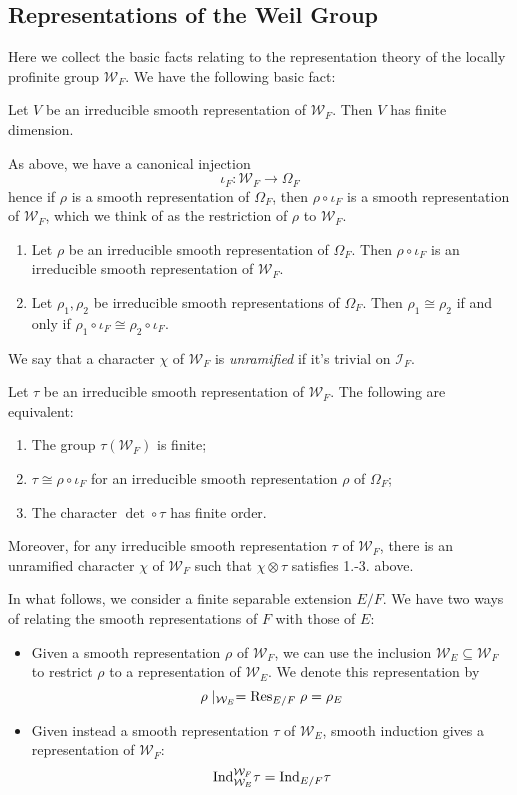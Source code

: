 \subsection{Representations of the Weil Group}
Here we collect the basic facts relating to the representation theory of the locally profinite group $\mathcal{W}_F$. We have the following basic fact:
\begin{lemma}
	Let $V$ be an irreducible smooth representation of $\mathcal{W}_F$. Then $V$ has finite dimension.
\end{lemma}
As above, we have a canonical injection
\[\iota_F: \mathcal{W}_F\to \Omega_F\]
hence if $\rho$ is a smooth representation of $\Omega_F$, then $\rho\circ \iota_F$ is a smooth representation of $\mathcal{W}_F$, which we think of as the restriction of $\rho$ to $\mathcal{W}_F$. 
\begin{lemma}
\begin{enumerate}
	\item Let $\rho$ be an irreducible smooth representation of $\Omega_F$. Then $\rho\circ \iota_F$ is an irreducible smooth representation of $\mathcal{W}_F$.
	\item Let $\rho_1, \rho_2$ be irreducible smooth representations of $\Omega_F$. Then $\rho_1\cong \rho_2$ if and only if $\rho_1\circ \iota_F\cong \rho_2\circ\iota_F$. 
\end{enumerate}
\end{lemma}
We say that a character $\chi$ of $\mathcal{W}_F$ is \emph{unramified} if it's trivial on $\mathcal{I}_F$. 
\begin{prop}
	Let $\tau$ be an irreducible smooth representation of $\mathcal{W}_F$. The following are equivalent:
	\begin{enumerate}
		\item The group $\tau(\mathcal{W}_F)$ is finite;
		\item $\tau \cong \rho\circ\iota_F $ for an irreducible smooth representation $\rho$ of $\Omega_F$;
		\item The character $\det \circ \tau$ has finite order.
	\end{enumerate}
	Moreover, for any irreducible smooth representation $\tau$ of $\mathcal{W}_F$, there is an unramified character $\chi$ of $\mathcal{W}_F$ such that $\chi\otimes \tau$ satisfies 1.-3. above.
\end{prop}
In what follows, we consider a finite separable extension $E/F$. We have two ways of relating the smooth representations of $F$ with those of $E$:
\begin{itemize}
	\item Given a smooth representation $\rho$ of $\mathcal{W}_F$, we can use the inclusion $\mathcal{W}_E\subseteq \mathcal{W}_F$ to restrict $\rho$ to a representation of $\mathcal{W}_E$. We denote this representation by 
	\[\rho\mid_{\mathcal{W}_E} = \mathrm{Res}_{E/F} \;\rho = \rho_E\]
	\item Given instead a smooth representation $\tau$ of $\mathcal{W}_E$, smooth induction gives a representation of $\mathcal{W}_F$:
	\[\mathrm{Ind}_{\mathcal{W}_E}^{\mathcal{W}_F}\tau = \mathrm{Ind}_{E/F} \tau\]
\end{itemize}

